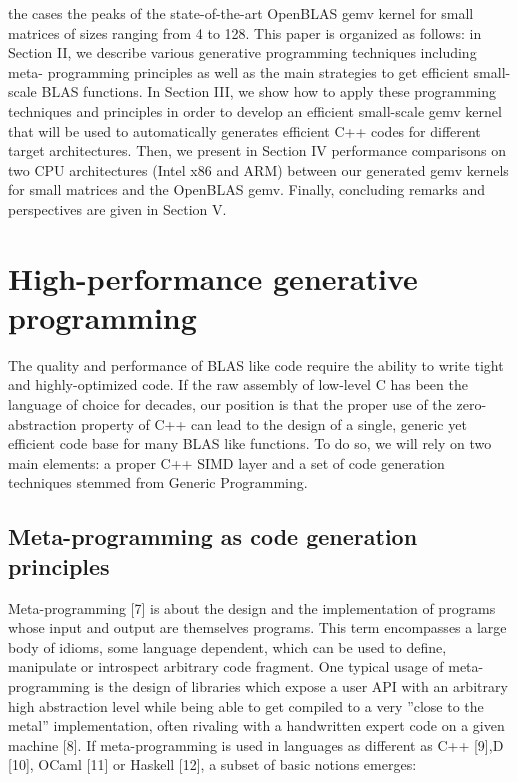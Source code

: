 \documentclass[../../main.tex]{subfiles}
\begin{document}
the cases the peaks of the state-of-the-art OpenBLAS gemv
kernel for small matrices of sizes ranging from 4 to 128.
This paper is organized as follows: in Section II, we describe
various generative programming techniques including meta-
programming principles as well as the main strategies to get
efficient small-scale BLAS functions. In Section III, we show
how to apply these programming techniques and principles
in order to develop an efficient small-scale gemv kernel that
will be used to automatically generates efficient C++ codes for
different target architectures. Then, we present in Section IV
performance comparisons on two CPU architectures (Intel
x86 and ARM) between our generated gemv kernels for
small matrices and the OpenBLAS gemv. Finally, concluding
remarks and perspectives are given in Section V.

\section{High-performance generative programming}

The quality and performance of BLAS like code require
the ability to write tight and highly-optimized code. If the
raw assembly of low-level C has been the language of choice
for decades, our position is that the proper use of the zero-
abstraction property of C++ can lead to the design of a single,
generic yet efficient code base for many BLAS like functions.
To do so, we will rely on two main elements: a proper C++
SIMD layer and a set of code generation techniques stemmed
from Generic Programming.

\subsection{Meta-programming as code generation principles}

Meta-programming [7] is about the design and the
implementation of programs whose input and output
are themselves programs. This term encompasses a large
body of idioms, some language dependent, which can be used
to define, manipulate or introspect arbitrary code fragment.
One typical usage of meta-programming is the design of
libraries which expose a user API with an arbitrary high
abstraction level while being able to get compiled to a very
”close to the metal” implementation, often rivaling with a
handwritten expert code on a given machine [8].
If meta-programming is used in languages as different as
C++ [9],D [10], OCaml [11] or Haskell [12], a subset of
basic notions emerges:
\end{document}
